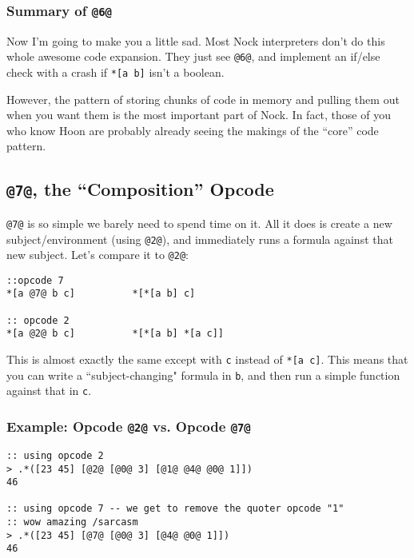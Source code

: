\documentclass[twoside]{article}
\begin{document}
\subsubsection{Summary of \lstinline[style=inlinecode]{@6@}}

Now I'm going to make you a little sad. Most Nock interpreters don't do this whole awesome code expansion. They just see \lstinline[style=inlinecode]{@6@}, and implement an if/else check with a crash if \lstinline[style=inlinecode]{*[a b]} isn't a boolean.

However, the pattern of storing chunks of code in memory and pulling them out when you want them is the most important part of Nock. In fact, those of you who know Hoon are probably already seeing the makings of the ``core'' code pattern.

\subsection{\lstinline[style=inlinecode]{@7@}, the “Composition” Opcode}

\lstinline[style=inlinecode]{@7@} is so simple we barely need to spend time on it. All it does is create a new subject/environment (using \lstinline[style=inlinecode]{@2@}), and immediately runs a formula against that new subject. Let's compare it to \lstinline[style=inlinecode]{@2@}:

\begin{lstlisting}[style=listingcode]
::opcode 7
*[a @7@ b c]          *[*[a b] c]

:: opcode 2
*[a @2@ b c]          *[*[a b] *[a c]]
\end{lstlisting}

This is almost exactly the same except with \lstinline[style=inlinecode]{c} instead of \lstinline[style=inlinecode]{*[a c]}. This means that you can write a ``subject-changing" formula in \lstinline[style=inlinecode]{b}, and then run a simple function against that in \lstinline[style=inlinecode]{c}.

\subsubsection{Example: Opcode \lstinline[style=inlinecode]{@2@} vs. Opcode \lstinline[style=inlinecode]{@7@}}

\begin{lstlisting}[style=listingcode]
:: using opcode 2
> .*([23 45] [@2@ [@0@ 3] [@1@ @4@ @0@ 1]])
46

:: using opcode 7 -- we get to remove the quoter opcode "1"
:: wow amazing /sarcasm
> .*([23 45] [@7@ [@0@ 3] [@4@ @0@ 1]])
46
\end{lstlisting}
\end{document}
